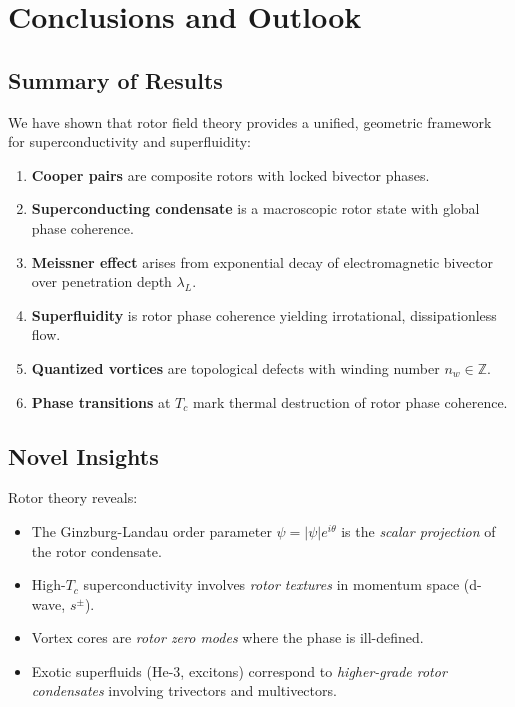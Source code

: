 \documentclass[12pt,a4paper]{article}
\theoremstyle{definition}
\theoremstyle{remark}
\begin{document}
\section{Conclusions and Outlook}

\subsection{Summary of Results}

We have shown that rotor field theory provides a unified, geometric framework for superconductivity and superfluidity:

\begin{enumerate}
\item \textbf{Cooper pairs} are composite rotors with locked bivector phases.
\item \textbf{Superconducting condensate} is a macroscopic rotor state with global phase coherence.
\item \textbf{Meissner effect} arises from exponential decay of electromagnetic bivector over penetration depth $\lambda_L$.
\item \textbf{Superfluidity} is rotor phase coherence yielding irrotational, dissipationless flow.
\item \textbf{Quantized vortices} are topological defects with winding number $n_w \in \mathbb{Z}$.
\item \textbf{Phase transitions} at $T_c$ mark thermal destruction of rotor phase coherence.
\end{enumerate}

\subsection{Novel Insights}

Rotor theory reveals:
\begin{itemize}
\item The Ginzburg-Landau order parameter $\psi = |\psi| e^{i\theta}$ is the \emph{scalar projection} of the rotor condensate.
\item High-$T_c$ superconductivity involves \emph{rotor textures} in momentum space (d-wave, $s^\pm$).
\item Vortex cores are \emph{rotor zero modes} where the phase is ill-defined.
\item Exotic superfluids (He-3, excitons) correspond to \emph{higher-grade rotor condensates} involving trivectors and multivectors.
\end{itemize}
\end{document}
